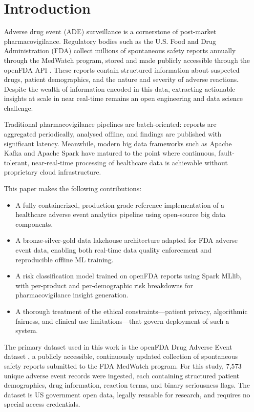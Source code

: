 \documentclass[conference]{IEEEtran}
\begin{document}
\section{Introduction}

Adverse drug event (ADE) surveillance is a cornerstone of post-market pharmacovigilance. Regulatory bodies such as the U.S. Food and Drug Administration (FDA) collect millions of spontaneous safety reports annually through the MedWatch program, stored and made publicly accessible through the openFDA API \cite{openfda}. These reports contain structured information about suspected drugs, patient demographics, and the nature and severity of adverse reactions. Despite the wealth of information encoded in this data, extracting actionable insights at scale in near real-time remains an open engineering and data science challenge.

Traditional pharmacovigilance pipelines are batch-oriented: reports are aggregated periodically, analysed offline, and findings are published with significant latency. Meanwhile, modern big data frameworks such as Apache Kafka \cite{kafka} and Apache Spark \cite{spark} have matured to the point where continuous, fault-tolerant, near-real-time processing of healthcare data is achievable without proprietary cloud infrastructure.

This paper makes the following contributions:
\begin{itemize}
    \item A fully containerized, production-grade reference implementation of a healthcare adverse event analytics pipeline using open-source big data components.
    \item A bronze-silver-gold data lakehouse architecture \cite{lakehouse} adapted for FDA adverse event data, enabling both real-time data quality enforcement and reproducible offline ML training.
    \item A risk classification model trained on openFDA reports using Spark MLlib, with per-product and per-demographic risk breakdowns for pharmacovigilance insight generation.
    \item A thorough treatment of the ethical constraints—patient privacy, algorithmic fairness, and clinical use limitations—that govern deployment of such a system.
\end{itemize}

The primary dataset used in this work is the openFDA Drug Adverse Event dataset \cite{openfda}, a publicly accessible, continuously updated collection of spontaneous safety reports submitted to the FDA MedWatch program. For this study, 7,573 unique adverse event records were ingested, each containing structured patient demographics, drug information, reaction terms, and binary seriousness flags. The dataset is US government open data, legally reusable for research, and requires no special access credentials.
\end{document}

